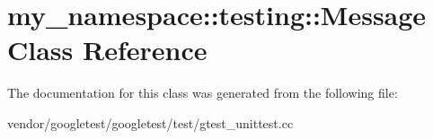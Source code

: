 \hypertarget{classmy__namespace_1_1testing_1_1_message}{}\section{my\+\_\+namespace\+:\+:testing\+:\+:Message Class Reference}
\label{classmy__namespace_1_1testing_1_1_message}


The documentation for this class was generated from the following file\+:\begin{DoxyCompactItemize}
\item 
vendor/googletest/googletest/test/gtest\+\_\+unittest.\+cc\end{DoxyCompactItemize}
